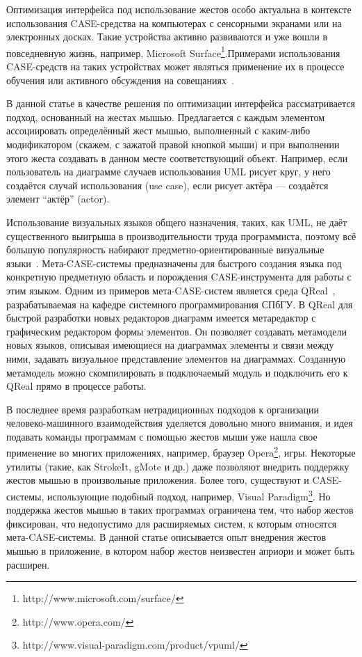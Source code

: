 \documentclass[a5paper]{article}
\begin{document}
Оптимизация интерфейса под использование жестов особо актуальна в контексте использования CASE-средства на компьютерах с сенсорными экранами или на электронных досках. Такие устройства активно развиваются и уже вошли в повседневную жизнь, например, Microsoft Surface\footnote{http://www.microsoft.com/surface/}.Примерами использования CASE-средств на таких устройствах может являться применение их в процессе обучения или активного обсуждения на совещаниях~\cite{ideogramic}. 

В данной статье в качестве решения по оптимизации интерфейса рассматривается подход, основанный на жестах мышью. Предлагается с каждым элементом ассоциировать определённый жест мышью, выполненный с каким-либо модификатором (скажем, с зажатой правой кнопкой мыши) и при выполнении этого жеста создавать в данном месте соответствующий объект. Например, если пользователь на диаграмме случаев использования UML рисует круг, у него создаётся случай использования (use case), если рисует актёра --- создаётся элемент ``актёр'' (actor).

Использование визуальных языков общего назначения, таких, как UML, не даёт существенного выигрыша в производительности труда программиста, поэтому всё большую популярность набирают предметно-ориентированные визуальные языки~\cite{theBook, dsm}. Мета-CASE-системы предназначены для быстрого создания языка под конкретную предметную область и порождения CASE-инструмента для работы с этим языком. Одним из примеров мета-CASE-систем является среда QReal~\cite{qreal}, разрабатываемая на кафедре системного программирования СПбГУ. В QReal для быстрой разработки новых редакторов диаграмм имеется метаредактор с графическим редактором формы элементов. Он позволяет создавать метамодели новых языков, описывая имеющиеся на диаграммах элементы и связи между ними, задавать визуальное представление элементов на диаграммах. Созданную метамодель можно скомпилировать в подключаемый модуль и подключить его к QReal прямо в процессе работы.

В последнее время разработкам нетрадиционных подходов к организации человеко-машинного взаимодействия уделяется довольно много внимания, и идея подавать команды программам с помощью жестов мыши уже нашла свое применение во многих приложениях, например, браузер Opera\footnote{http://www.opera.com/}, игры. Некоторые утилиты (такие, как StrokeIt, gMote и др.) даже позволяют внедрить поддержку  жестов мышью в произвольные приложения. Более того, существуют и CASE-системы, использующие подобный подход, например, Visual Paradigm\footnote{http://www.visual-paradigm.com/product/vpuml/}. Но поддержка жестов мышью в таких программах ограничена тем, что набор жестов фиксирован, что недопустимо для расширяемых систем, к которым относятся мета-CASE-системы. В данной статье описывается опыт внедрения жестов мышью в приложение, в котором набор жестов неизвестен априори и может быть расширен.
\end{document}
